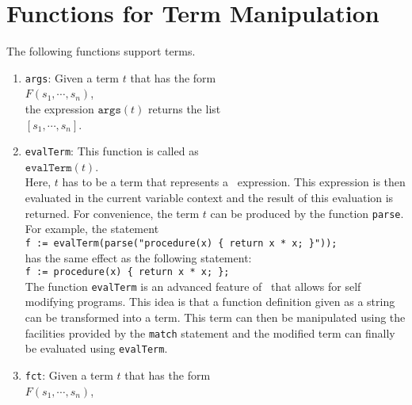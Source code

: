 \section{Functions for Term Manipulation}
The following functions support terms.
\begin{enumerate}
\item \texttt{args}:  Given a term $t$ that has the form
      \\[0.2cm]
      \hspace*{1.3cm}
      $F(s_1, \cdots, s_n)$,
      \\[0.2cm]
      the expression $\mathtt{args}(t)$ returns the list
      \\[0.2cm]
      \hspace*{1.3cm}
      $[s_1, \cdots, s_n]$.
\item \texttt{evalTerm}: This function is called as
      \\[0.2cm]
      \hspace*{1.3cm}
      $\mathtt{evalTerm}(t)$.
      \\[0.2cm]
      Here, $t$ has to be a term that represents a  \setlx\ expression.  This expression
      is then evaluated in the current variable context and the result of this evaluation is
      returned.   For convenience, the term $t$ can be produced by the function \texttt{parse}.
      For example, the statement
      \\[0.2cm]
      \hspace*{1.3cm}
      \texttt{f := evalTerm(parse("procedure(x) \{ return x * x; \}"));}
      \\[0.2cm]
      has the same effect as the following statement:
      \\[0.2cm]
      \hspace*{1.3cm}
      \texttt{f := procedure(x) \{ return x * x; \};}
      \\[0.2cm]
      The function \texttt{evalTerm} is an advanced feature of \setlx\ that allows for
      self modifying programs.  This idea is that a function definition given as a string can be
      transformed into a term.  This term can then be manipulated using the facilities provided
      by the \texttt{match} statement and the modified term can finally be evaluated using
      \texttt{evalTerm}. 
\item \texttt{fct}:  Given a term $t$ that has the form
      \\[0.2cm]
      \hspace*{1.3cm}
      $F(s_1, \cdots, s_n)$,
      \\[0.2cm]

\end{enumerate}
